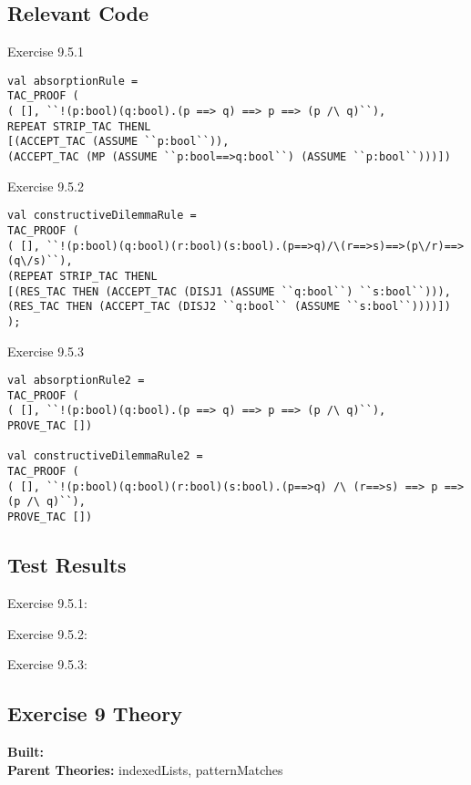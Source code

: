 \documentclass[11pt, twoside]{article}
\begin{document}
\subsection{Relevant Code}

Exercise 9.5.1
\begin{lstlisting}[basicstyle=\small,]
  val absorptionRule = 
TAC_PROOF (
( [], ``!(p:bool)(q:bool).(p ==> q) ==> p ==> (p /\ q)``),
REPEAT STRIP_TAC THENL
[(ACCEPT_TAC (ASSUME ``p:bool``)),
(ACCEPT_TAC (MP (ASSUME ``p:bool==>q:bool``) (ASSUME ``p:bool``)))])
\end{lstlisting}

Exercise 9.5.2
\begin{lstlisting}[basicstyle=\small,]
val constructiveDilemmaRule = 
TAC_PROOF (
( [], ``!(p:bool)(q:bool)(r:bool)(s:bool).(p==>q)/\(r==>s)==>(p\/r)==>(q\/s)``),
(REPEAT STRIP_TAC THENL
[(RES_TAC THEN (ACCEPT_TAC (DISJ1 (ASSUME ``q:bool``) ``s:bool``))),
(RES_TAC THEN (ACCEPT_TAC (DISJ2 ``q:bool`` (ASSUME ``s:bool``))))])
);
\end{lstlisting}

Exercise 9.5.3
\begin{lstlisting}[basicstyle=\small,]
val absorptionRule2 = 
TAC_PROOF (
( [], ``!(p:bool)(q:bool).(p ==> q) ==> p ==> (p /\ q)``),
PROVE_TAC [])

val constructiveDilemmaRule2 = 
TAC_PROOF (
( [], ``!(p:bool)(q:bool)(r:bool)(s:bool).(p==>q) /\ (r==>s) ==> p ==> (p /\ q)``),
PROVE_TAC [])
\end{lstlisting}

\newpage 

\subsection{Test Results}


Exercise 9.5.1:



Exercise 9.5.2:



Exercise 9.5.3:







\newpage

\HOLpagestyle

\subsection{Exercise 9 Theory}
\begin{flushleft}
\textbf{Built:} \HOLexerciseNineDate \\[2pt]
\textbf{Parent Theories:} indexedLists, patternMatches
\end{flushleft}
\end{document}
